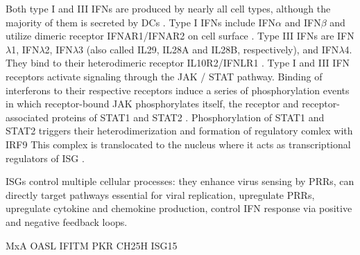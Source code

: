 		Both type I and III \gls{IFN}s are produced by nearly all cell types, although the majority of them is secreted by \gls{DC}s \parencite{Siegal1999, Odendall2014}. Type I \gls{IFN}s include \gls{IFN}$\alpha$ and \gls{IFN}$\beta$ and utilize dimeric receptor IFNAR1/IFNAR2 on cell surface \parencite{Mogensen1999}. Type III \gls{IFN}s are \gls{IFN}$\lambda$1, \gls{IFN}$\lambda$2, \gls{IFN}$\lambda$3 (also called \gls{IL}29, \gls{IL}28A and \gls{IL}28B, respectively), and \gls{IFN}$\lambda$4. They bind to their heterodimeric receptor IL10R2/IFNLR1 \parencite{Kotenko2003, Sheppard2003}. Type I and III \gls{IFN} receptors activate signaling through the \gls{JAK} / \gls{STAT} pathway. Binding of interferons to their respective receptors induce a series of phosphorylation events in which receptor-bound \gls{JAK} phosphorylates itself, the receptor and receptor-associated proteins of \gls{STAT}1 and \gls{STAT}2 \parencite{VanBoxel-Dezaire2006}. Phosphorylation of \gls{STAT}1 and \gls{STAT}2 triggers their heterodimerization and formation of regulatory comlex with \gls{IRF}9 \parencite{Fu1990} This complex is translocated to the nucleus where it acts as transcriptional regulators of \gls{ISG} \parencite{Levy1988}.
		
		\gls{ISG}s control multiple cellular processes: they enhance virus sensing by \gls{PRR}s, can directly target pathways essential for viral replication, upregulate \gls{PRR}s, upregulate cytokine and chemokine production, control \gls{IFN} response via positive and negative feedback loops.    
		
		MxA
		OASL
		IFITM
		PKR
		CH25H
		ISG15
		
